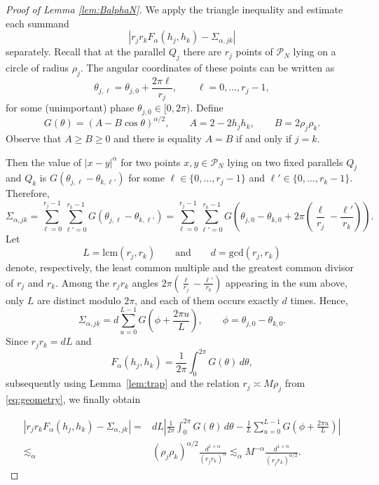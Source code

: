 \documentclass[11pt]{amsart}
\begin{document}
\begin{proof}[Proof of Lemma \ref{lem:BalphaN}]

We apply the triangle inequality and estimate each summand
\[ \left|r_jr_kF_\alpha(h_j,h_k) -\Sigma_{\alpha,jk}\right| \]
separately. Recall that at the parallel $Q_j$ there are $r_j$ points of $\mathcal P_N$ lying on a circle of radius $\rho_j$. The angular coordinates of these points can be written as \[ \theta_{j,\ell} = \theta_{j,0}+\frac{2\pi \ell}{r_j}, \qquad \ell=0,\dots,r_j-1, \] for some (unimportant) phase $\theta_{j,0}\in[0,2\pi)$. Define
\begin{equation*}%
G(\theta) = (A-B\cos\theta)^{\alpha/2}, \qquad A=2-2h_jh_k, \qquad B=2\rho_j\rho_k.
\end{equation*}
Observe that $A\ge B\ge 0$ and there is  equality $A=B$ if and only if $j=k.$

Then the value of $|x-y|^\alpha$ for two points $x,y\in\mathcal P_N$ lying on two fixed parallels $Q_j$ and $Q_k$ is $G(\theta_{j,\ell}-\theta_{k,\ell'})$ for some $\ell\in\{0,\dots,r_j-1\}$ and $\ell'\in\{0,\dots,r_k-1\}$. Therefore,
\begin{equation*} \Sigma_{\alpha,jk} = \sum_{\ell=0}^{r_j-1}\sum_{\ell'=0}^{r_k-1} G(\theta_{j,\ell}-\theta_{k,\ell'})
= \sum_{\ell=0}^{r_j-1}\sum_{\ell'=0}^{r_k-1} G\left( \theta_{j,0}-\theta_{k,0} + 2\pi\left(\frac{\ell}{r_j}-\frac{\ell'}{r_k}\right) \right).
\end{equation*}
Let
\[ L=\mathrm{lcm}(r_j,r_k) \qquad\text{and}\qquad d=\mathrm{gcd}(r_j,r_k) \]
denote, respectively, the least common multiple and the greatest common divisor of $r_j$ and $r_k$. Among the $r_jr_k$ angles
$2\pi\left(\frac{\ell}{r_j}-\frac{\ell'}{r_k}\right)$
appearing in the sum above, only $L$ are distinct modulo $2\pi$, and each of them occurs exactly $d$ times. Hence,
\[
\Sigma_{\alpha,jk} = d\sum_{u=0}^{L-1} G\left(\phi+\frac{2\pi u}{L}\right), \qquad \phi=\theta_{j,0}-\theta_{k,0}. \]
Since $r_jr_k=dL$ and
\[ F_\alpha(h_j,h_k) = \frac{1}{2\pi}\int_0^{2\pi}G(\theta)\,d\theta, \]
subsequently using Lemma~\ref{lem:trap} and the relation $r_j\asymp M\rho_j$ from \eqref{eq:geometry}, we finally obtain

\begin{align*} %
|r_jr_kF_\alpha(h_j,h_k) -\Sigma_{\alpha,jk}|  =& dL\left| \frac{1}{2\pi}\int_0^{2\pi}G(\theta)\,d\theta - \frac{1}{L}\sum_{u=0}^{L-1} G\left(\phi+\frac{2\pi u}{L}\right) \right|\\\nonumber
    \lesssim_\alpha&
        (\rho_j\rho_k)^{\alpha/2}
    \frac{d^{1+\alpha}}{(r_jr_k)^\alpha}
    \lesssim_\alpha
     M^{-\alpha}
    \frac{d^{1+\alpha}}
         {(r_jr_k)^{\alpha/2}}\nonumber.
\end{align*}


\end{proof}
\end{document}
